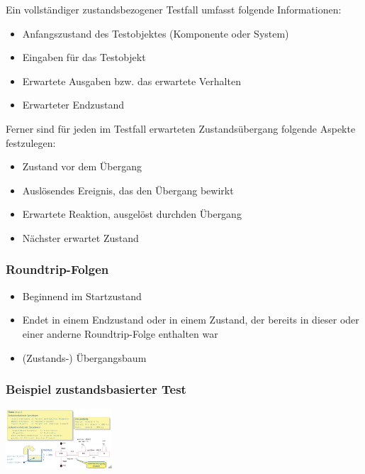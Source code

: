 \documentclass{report}
\newenvironment{Figure}
	{\par\medskip\noindent\minipage{\linewidth}}
	{\endminipage\par\medskip}
\theoremstyle{definition}
\theoremstyle{example}
\begin{document}
Ein vollständiger zustandsbezogener Testfall umfasst folgende Informationen:
\begin{itemize}
   \item Anfangszustand des Testobjektes (Komponente oder System)
   \item Eingaben für das Testobjekt
   \item Erwartete Ausgaben bzw. das erwartete Verhalten
   \item Erwarteter Endzustand
\end{itemize} 
Ferner sind für jeden im Testfall erwarteten Zustandsübergang folgende Aspekte festzulegen:
\begin{itemize}
   \item Zustand vor dem Übergang
   \item Auslösendes Ereignis, das den Übergang bewirkt
   \item Erwartete Reaktion, ausgelöst durchden Übergang
   \item Nächster erwartet Zustand
\end{itemize}

\subsubsection{Roundtrip-Folgen}
\begin{itemize}
   \item Beginnend im Startzustand
   \item Endet in einem Endzustand oder in einem Zustand, der bereits in dieser oder einer anderne Roundtrip-Folge enthalten war 
   \item (Zustands-) Übergangsbaum
\end{itemize}

\subsubsection{Beispiel zustandsbasierter Test}
\begin{Figure}
   \centering
    \includegraphics[width=150px]{img/ZustandsbasierterTestBsp.png}
        \label{fig:Beispiel eines zustandbasierten Tests}
    \end{Figure}
\end{document}
